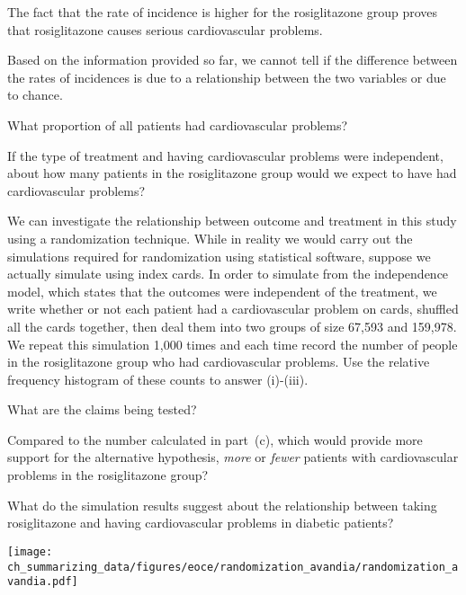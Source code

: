 {\begin{parts}
\begin{subparts}
\item The fact that the rate of incidence is higher for the rosiglitazone group proves that rosiglitazone causes serious cardiovascular problems.
\item Based on the information provided so far, we cannot tell if the difference between the rates of incidences is due to a relationship between the two variables or due to chance.
\end{subparts}
\item What proportion of all patients had cardiovascular problems?
\item If the type of treatment and having cardiovascular problems were independent, about how many patients in the rosiglitazone group would we expect to have had cardiovascular problems?
\item We can investigate the relationship between outcome and treatment in this study using a randomization technique.  While in reality we would carry out the simulations required for randomization using statistical software, suppose we actually simulate using index cards. In order to simulate from the independence model, which states that the outcomes were independent of the treatment, we write whether or not each patient had a cardiovascular problem on cards, shuffled all the cards together, then deal them into two groups of size 67,593 and 159,978. We repeat this simulation 1,000 times and each time record the number of people in the rosiglitazone group who had cardiovascular problems. Use the relative frequency histogram of these counts to answer (i)-(iii).
\end{parts}
\begin{minipage}[c]{0.5\textwidth}
\begin{subparts}
\item What are the claims being tested?
\item Compared to the number calculated in part~(c), which would provide more support for the alternative hypothesis,  \textit{more} or \textit{fewer} patients with cardiovascular problems in the rosiglitazone group?
\item What do the simulation results suggest about the relationship between taking rosiglitazone and having cardiovascular problems in diabetic patients?
\end{subparts}
\end{minipage}
\begin{minipage}[c]{0.5\textwidth}
\texttt{[image: ch\_summarizing\_data/figures/eoce/randomization\_avandia/randomization\_avandia.pdf]} \\
\end{minipage}
}{}

